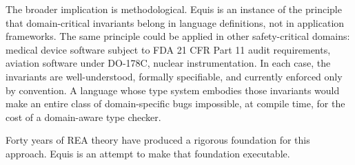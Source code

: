 \documentclass[11pt,a4paper]{article}
\theoremstyle{remark}
\begin{document}
The broader implication is methodological. Equis is an instance of
the principle that domain-critical invariants belong in language
definitions, not in application frameworks. The same principle could
be applied in other safety-critical domains: medical device software
subject to FDA 21 CFR Part 11 audit requirements, aviation software
under DO-178C, nuclear instrumentation. In each case, the invariants
are well-understood, formally specifiable, and currently enforced
only by convention. A language whose type system embodies those
invariants would make an entire class of domain-specific bugs
impossible, at compile time, for the cost of a domain-aware type
checker.

Forty years of REA theory have produced a rigorous foundation for this
approach. Equis is an attempt to make that foundation executable.

\printbibliography
\end{document}
